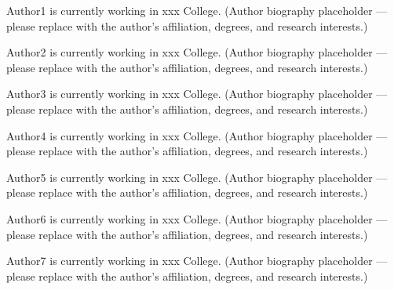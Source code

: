 \begin{IEEEbiographynophoto}{Author1}
is currently working in xxx College. (Author biography placeholder --- please
replace with the author's affiliation, degrees, and research interests.)
\end{IEEEbiographynophoto}

\begin{IEEEbiographynophoto}{Author2}
is currently working in xxx College. (Author biography placeholder --- please
replace with the author's affiliation, degrees, and research interests.)
\end{IEEEbiographynophoto}

\begin{IEEEbiographynophoto}{Author3}
is currently working in xxx College. (Author biography placeholder --- please
replace with the author's affiliation, degrees, and research interests.)
\end{IEEEbiographynophoto}

\begin{IEEEbiographynophoto}{Author4}
is currently working in xxx College. (Author biography placeholder --- please
replace with the author's affiliation, degrees, and research interests.)
\end{IEEEbiographynophoto}

\begin{IEEEbiographynophoto}{Author5}
is currently working in xxx College. (Author biography placeholder --- please
replace with the author's affiliation, degrees, and research interests.)
\end{IEEEbiographynophoto}

\begin{IEEEbiographynophoto}{Author6}
is currently working in xxx College. (Author biography placeholder --- please
replace with the author's affiliation, degrees, and research interests.)
\end{IEEEbiographynophoto}

\begin{IEEEbiographynophoto}{Author7}
is currently working in xxx College. (Author biography placeholder --- please
replace with the author's affiliation, degrees, and research interests.)
\end{IEEEbiographynophoto}
